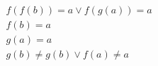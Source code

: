 \begin{align*}
%
& f(f(b)) = a \lor f(g(a)) = a
~\\~
& f(b) = a
~\\~
& g(a) = a
~\\~
& g(b)  \neq  g(b) \lor f(a)  \neq  a
%
\end{align*}
